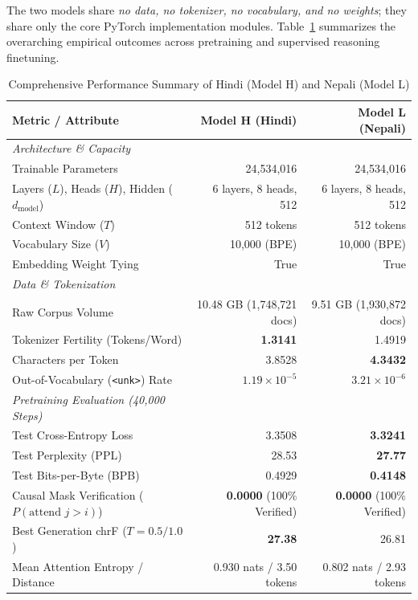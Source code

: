 \documentclass[11pt,a4paper]{article}
\begin{document}
The two models share \textit{no data, no tokenizer, no vocabulary, and no weights}; they share only the core PyTorch implementation modules. Table~\ref{tab:executive_summary} summarizes the overarching empirical outcomes across pretraining and supervised reasoning finetuning.

\begin{table}[H]
\centering
\small
\caption{Comprehensive Performance Summary of Hindi (Model H) and Nepali (Model L)}
\label{tab:executive_summary}
\begin{tabular}{@{}lrr@{}}
\toprule
\textbf{Metric / Attribute} & \textbf{Model H (Hindi)} & \textbf{Model L (Nepali)} \\
\midrule
\textit{Architecture \& Capacity} & & \\
Trainable Parameters & 24,534,016 & 24,534,016 \\
Layers ($L$), Heads ($H$), Hidden ($d_{\text{model}}$) & 6 layers, 8 heads, 512 & 6 layers, 8 heads, 512 \\
Context Window ($T$) & 512 tokens & 512 tokens \\
Vocabulary Size ($V$) & 10,000 (BPE) & 10,000 (BPE) \\
Embedding Weight Tying & True & True \\
\midrule
\textit{Data \& Tokenization} & & \\
Raw Corpus Volume & 10.48 GB (1,748,721 docs) & 9.51 GB (1,930,872 docs) \\
Tokenizer Fertility (Tokens/Word) & \textbf{1.3141} & 1.4919 \\
Characters per Token & 3.8528 & \textbf{4.3432} \\
Out-of-Vocabulary (\texttt{<unk>}) Rate & $1.19 \times 10^{-5}$ & $3.21 \times 10^{-6}$ \\
\midrule
\textit{Pretraining Evaluation (40,000 Steps)} & & \\
Test Cross-Entropy Loss & 3.3508 & \textbf{3.3241} \\
Test Perplexity (PPL) & 28.53 & \textbf{27.77} \\
Test Bits-per-Byte (BPB) & 0.4929 & \textbf{0.4148} \\
Causal Mask Verification ($P(\text{attend } j > i)$) & \textbf{0.0000} (100\% Verified) & \textbf{0.0000} (100\% Verified) \\
Best Generation chrF ($T=0.5 / 1.0$) & \textbf{27.38} & 26.81 \\
Mean Attention Entropy / Distance & 0.930 nats / 3.50 tokens & 0.802 nats / 2.93 tokens \\

\end{tabular}
\end{table}
\end{document}
